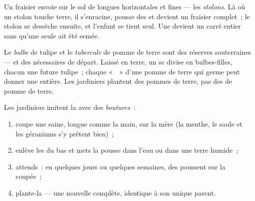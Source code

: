 \begin{example}\label{ex:g4:plants-without-seeds:runner}
Un fraisier envoie sur le sol de longues  horizontales et fines
--- les \emph{stolons}. Là où un stolon touche terre,
il s'enracine, pousse des  et devient un fraisier complet~;
le stolon se dessèche ensuite, et l'enfant se tient seul. Une 
devient un carré entier sans qu'une seule  ait été semée.
\end{example}

\begin{example}\label{ex:g4:plants-without-seeds:bulbtuber}
Le \emph{bulbe} de tulipe et le
\emph{tubercule} de pomme de terre sont des
réserves souterraines --- et des nécessaires de départ. Laissé en
terre, un  se divise en bulbes-filles, chacun une future
tulipe~; chaque «~~» d'une pomme de terre qui germe peut donner
une  entière. Les jardiniers plantent des pommes de terre, pas
des  de pomme de terre.
\end{example}

\begin{method}\label{met:g4:plants-without-seeds:cutting}
Les jardiniers imitent la  avec des
\emph{boutures}~:
\begin{enumerate}
  \item coupe une  saine, longue comme la main, sur la
         mère (la menthe, le saule et les géraniums
        s'y prêtent bien)~;
  \item enlève les  du bas et mets la pousse dans l'eau ou
        dans une terre humide~;
  \item attends~: en quelques jours ou quelques semaines, des
         poussent sur la  coupée~;
  \item plante-la --- une nouvelle  complète, identique à son
        unique parent.
\end{enumerate}
\end{method}

